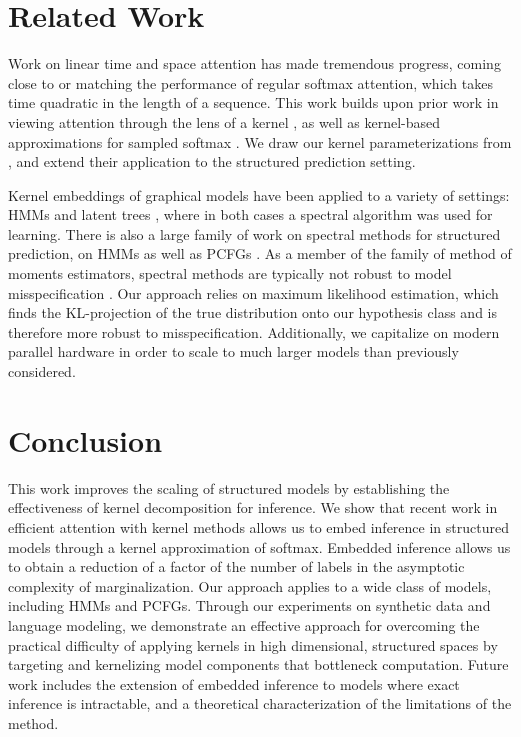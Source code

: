 \documentclass{article}
\begin{document}
\section{Related Work}

Work on linear time and space attention has made tremendous progress, coming close to \citep{shen2018linearattn,katharopoulos2020lineartransformer,wang2020linformer} or matching \citep{choromanski2020performer,peng2021rfa} the performance of regular softmax attention, which takes time quadratic in the length of a sequence.
This work builds upon prior work in viewing attention through the lens of a kernel \citep{tsai2019kernelattn}, as well as kernel-based approximations for sampled softmax \citep{blanc2018sampledsoftmax,rawat2019sampledsoftmax}.
We draw our kernel parameterizations from \citet{choromanski2020performer}, and extend their application to the structured prediction setting.

Kernel embeddings of graphical models \citep{song2011kernelbp}
have been applied to a variety of settings:
HMMs \citep{song2010kernelhmm}
and latent trees \citep{song2011kerneltree},
where in both cases a spectral algorithm was used for learning. There is also a large family of work on spectral methods for structured prediction, on HMMs \citep{hsu2012spectral} as well as PCFGs \citep{cohen2012lpcfg,clark-fijalkow-2020-consistent}. As a member of the family of method of moments estimators, spectral methods are typically not robust to model misspecification \citep{ruffini2017mom}. Our approach relies on maximum likelihood estimation, which finds the KL-projection of the true distribution onto our hypothesis class and is therefore more robust to misspecification.
Additionally, we capitalize on modern parallel hardware in order to scale to much larger models than previously considered.

\section{Conclusion}

This work improves the scaling of structured models by  establishing the effectiveness of kernel decomposition for inference. We show that recent work in efficient attention with kernel methods \citep{choromanski2020performer,peng2021rfa} allows us to embed inference in structured models through a kernel approximation of softmax. Embedded inference allows us to obtain a reduction of a factor of the number of labels in the asymptotic complexity of marginalization. Our approach applies to a wide class of models, including HMMs and PCFGs. Through our experiments on synthetic data and language modeling, we demonstrate an effective approach for overcoming the practical difficulty of applying kernels in high dimensional, structured spaces by targeting and kernelizing model components that bottleneck computation. Future work includes the extension of embedded inference to models where exact inference is intractable, and a theoretical characterization of the limitations of the method.
\end{document}
